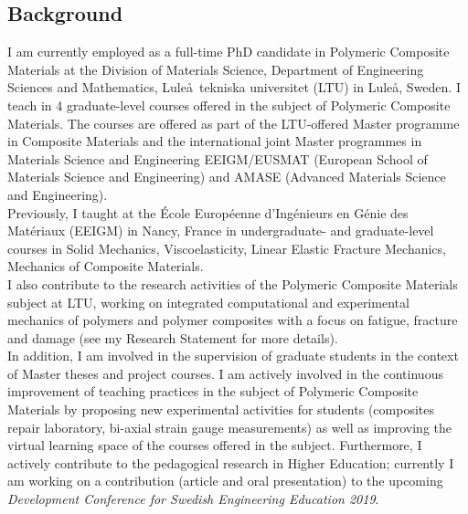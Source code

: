 \documentclass[
  a4paper, 
]{fortysecondscv}
\begin{document}
\makefrontsidebar

\subsection{Background}
I am currently employed as a full-time PhD candidate in Polymeric Composite Materials at the Division of Materials Science, Department of Engineering Sciences and Mathematics, Lule\aa\ tekniska universitet (LTU) in Lule\aa, Sweden. I teach in 4 graduate-level courses offered in the subject of Polymeric Composite Materials. The courses are offered as part of the LTU-offered Master programme in Composite Materials and the international joint Master programmes in Materials Science and Engineering EEIGM/EUSMAT (European School of Materials Science and Engineering) and AMASE (Advanced Materials Science and Engineering).\\ Previously, I taught at the \'Ecole Europ\'eenne d'Ing\'enieurs en G\'enie des Mat\'eriaux (EEIGM) in Nancy, France in undergraduate- and graduate-level courses in Solid Mechanics, Viscoelasticity, Linear Elastic Fracture Mechanics, Mechanics of Composite Materials.\\I also contribute to the research activities of the Polymeric Composite Materials subject at LTU, working on integrated computational and experimental mechanics of polymers and polymer composites with a focus on fatigue, fracture and damage (see my Research Statement for more details).\\In addition, I am involved in the supervision of graduate students in the context of Master theses and project courses. I am actively involved in the continuous improvement of teaching practices in the subject of Polymeric Composite Materials by proposing new experimental activities for students (composites repair laboratory, bi-axial strain gauge measurements) as well as improving the virtual learning space of the courses offered in the subject. Furthermore, I actively contribute to the pedagogical research in Higher Education; currently I am working on a contribution (article and oral presentation) to the upcoming \textit{Development Conference for Swedish Engineering Education 2019}.
\end{document}
